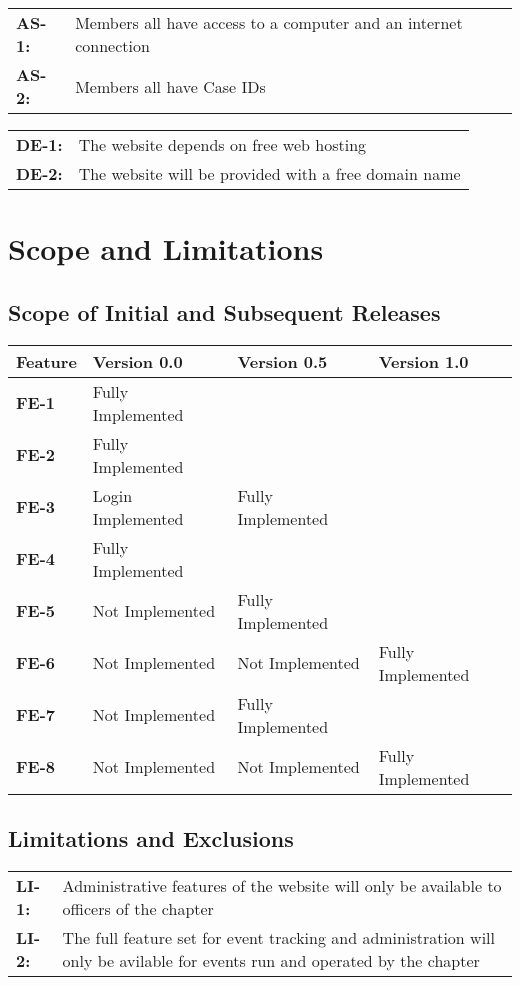 \documentclass[11pt,letterpaper,rotate]{article}
\begin{document}
\begin{longtable}{lp{12cm}}
{\bf AS-1:} & Members all have access to a computer and an internet
connection\\
{\bf AS-2:} & Members all have Case IDs\\
\end{longtable}

\begin{longtable}{lp{12cm}}
{\bf DE-1:} & The website depends on free web hosting\\
{\bf DE-2:} & The website will be provided with a free domain name\\
\end{longtable}

\section{Scope and Limitations}

\subsection{Scope of Initial and Subsequent Releases}

\begin{longtable}{|l|p{4cm}|p{4cm}|p{4cm}|}
\hline
{\bf Feature} & {\bf Version 0.0} & {\bf Version 0.5} & {\bf Version 1.0} \\
\hline
{\bf FE-1} & Fully Implemented & ~ & ~ \\ \hline
{\bf FE-2} & Fully Implemented & ~ & ~ \\ \hline
{\bf FE-3} & Login Implemented & Fully Implemented & ~ \\ \hline
{\bf FE-4} & Fully Implemented & ~ & ~ \\ \hline
{\bf FE-5} & Not Implemented & Fully Implemented & ~ \\ \hline
{\bf FE-6} & Not Implemented & Not Implemented & Fully Implemented \\
\hline
{\bf FE-7} & Not Implemented & Fully Implemented & ~ \\ \hline
{\bf FE-8} & Not Implemented & Not Implemented & Fully Implemented \\ \hline
\end{longtable}

\subsection{Limitations and Exclusions}

\begin{longtable}{lp{12cm}}
{\bf LI-1:} & Administrative features of the website will only be
available to officers of the chapter\\
{\bf LI-2:} & The full feature set for event tracking and
administration will only be avilable for events run and operated by
the chapter\\
\end{longtable}
\newpage
\end{document}
